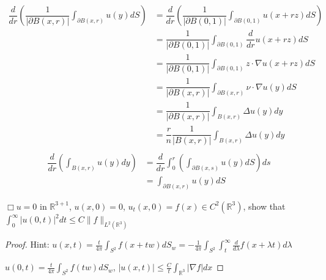 \documentclass[main]{subfiles}
\begin{document}
\begin{exercise}
\begin{align*}
\dfrac{d}{dr}\left( \dfrac{1}{\left|\partial B(x,r)\right|}\int_{\partial B(x,r)}u(y)dS \right)
&= \dfrac{d}{dr}\left( \dfrac{1}{|\partial B(0,1)|}\int_{\partial B(0,1)}u(x+rz)dS \right) \\
&= \dfrac{1}{|\partial B(0,1)|}\int_{\partial B(0,1)}\dfrac{d}{dr} u(x+rz)dS \\
&= \dfrac{1}{|\partial B(0,1)|}\int_{\partial B(0,1)}z\cdot \nabla u(x+rz)dS\\
&= \dfrac{1}{|\partial B(x,r)|}\int_{\partial B(x,r)}\nu\cdot \nabla u(y)dS \\
&= \dfrac{1}{|\partial B(x,r)|}\int_{B(x,r)}\Delta u(y)dy \\
&= \dfrac{r}{n}\dfrac{1}{|B(x,r)|}\int_{B(x,r)}\Delta u(y)dy \\
\end{align*}
\begin{align*}
\dfrac{d}{dr}\left( \int_{B(x,r)}u(y)dy \right)
&= \dfrac{d}{dr}\int_{0}^{r}\left( \int_{\partial B(x,s)}u(y)dS \right) ds \\
&= \int_{\partial B(x,r)}u(y)dS
\end{align*}
\end{exercise}

\begin{exercise}
$\Box u=0$ in $\mathbb R^{3+1}$, $u(x,0)=0$, $u_t(x,0)=f(x)\in C^2(\mathbb R^3)$, show that $\displaystyle\int_0^\infty|u(0,t)|^2dt\leq C\|f\|_{L^2(\mathbb R^3)}$
\end{exercise}

\begin{proof}
Hint: $\displaystyle u(x,t)=\frac{t}{4\pi}\int_{S^2}f(x+tw)dS_w=-\frac{1}{4\pi}\int_{S^2}\int_t^\infty\frac{d}{d\lambda}f(x+\lambda t)d\lambda$ \par
$\displaystyle u(0,t)=\frac{t}{4\pi}\int_{S^2}f(tw)dS_w$, $\displaystyle|u(x,t)|\leq\frac{C}{t}\int_{\mathbb R^3}|\nabla f|dx$
\end{proof}
\end{document}
